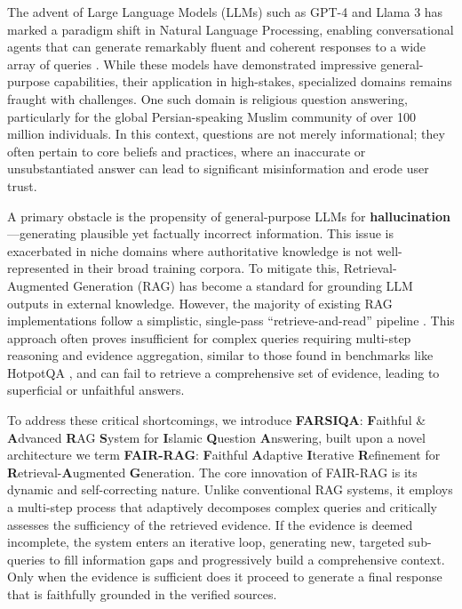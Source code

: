 \documentclass[11pt]{article}
\begin{document}
The advent of Large Language Models (LLMs) such as GPT-4 and Llama 3 has marked a paradigm shift in Natural Language Processing, enabling conversational agents that can generate remarkably fluent and coherent responses to a wide array of queries \cite{brown2020gpt3}. While these models have demonstrated impressive general-purpose capabilities, their application in high-stakes, specialized domains remains fraught with challenges. One such domain is religious question answering, particularly for the global Persian-speaking Muslim community of over 100 million individuals. In this context, questions are not merely informational; they often pertain to core beliefs and practices, where an inaccurate or unsubstantiated answer can lead to significant misinformation and erode user trust.

A primary obstacle is the propensity of general-purpose LLMs for \textbf{hallucination}---generating plausible yet factually incorrect information. \cite{ji2023survey} This issue is exacerbated in niche domains where authoritative knowledge is not well-represented in their broad training corpora. To mitigate this, Retrieval-Augmented Generation (RAG) \cite{lewis2020retrieval} has become a standard for grounding LLM outputs in external knowledge. However, the majority of existing RAG implementations follow a simplistic, single-pass ``retrieve-and-read'' pipeline \cite{gao2023retrieval, ram2023incontext}. This approach often proves insufficient for complex queries requiring multi-step reasoning and evidence aggregation, similar to those found in benchmarks like HotpotQA \cite{yang2018hotpotqa}, and can fail to retrieve a comprehensive set of evidence, leading to superficial or unfaithful answers.

To address these critical shortcomings, we introduce \textbf{FARSIQA}: \textbf{F}aithful \& \textbf{A}dvanced \textbf{R}AG \textbf{S}ystem for \textbf{I}slamic \textbf{Q}uestion \textbf{A}nswering, built upon a novel architecture we term \textbf{FAIR-RAG}: \textbf{F}aithful \textbf{A}daptive \textbf{I}terative \textbf{R}efinement for \textbf{R}etrieval-\textbf{A}ugmented \textbf{G}eneration. The core innovation of FAIR-RAG is its dynamic and self-correcting nature. Unlike conventional RAG systems, it employs a multi-step process that adaptively decomposes complex queries and critically assesses the sufficiency of the retrieved evidence. If the evidence is deemed incomplete, the system enters an iterative loop, generating new, targeted sub-queries to fill information gaps and progressively build a comprehensive context. Only when the evidence is sufficient does it proceed to generate a final response that is faithfully grounded in the verified sources.
\end{document}
